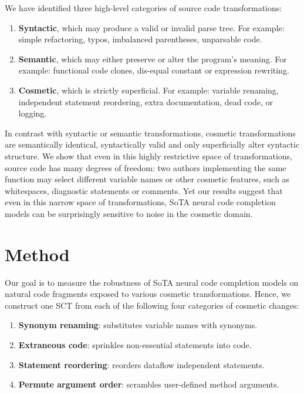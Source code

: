 \documentclass[usenames,dvipsnames]{article} %
\begin{document}
We have identified three high-level categories of source code transformations:

  \begin{enumerate}[itemsep=1ex]
    \item \textbf{Syntactic}, which may produce a valid or invalid parse tree. For example: simple refactoring, typos, imbalanced parentheses, unparsable code.
    \item \textbf{Semantic}, which may either preserve or alter the program's meaning. For example: functional code clones, dis-equal constant or expression rewriting.
    \item \textbf{Cosmetic}, which is strictly superficial. For example: variable renaming, independent statement reordering, extra documentation, dead code, or logging.
  \end{enumerate}

  In contrast with syntactic or semantic transformations, cosmetic transformations are semantically identical, syntactically valid and only superficially alter syntactic structure. We show that even in this highly restrictive space of transformations, source code has many degrees of freedom: two authors implementing the same function may select different variable names or other cosmetic features, such as whitespaces, diagnostic statements or comments.  Yet our results suggest that even in this narrow space of transformations, SoTA neural code completion models can be surprisingly sensitive to noise in the cosmetic domain.

  \section{Method}\label{sec:method}

  Our goal is to measure the robustness of SoTA neural code completion models on natural code fragments exposed to various cosmetic transformations. Hence, we construct one SCT from each of the following four categories of cosmetic changes:

  \begin{enumerate}[itemsep=1ex]
    \item \textbf{Synonym renaming}: substitutes variable names with synonyms.
    \item \textbf{Extraneous code}: sprinkles non-essential statements into code.
    \item \textbf{Statement reordering}: reorders dataflow independent statements.
    \item \textbf{Permute argument order}: scrambles user-defined method arguments.
  \end{enumerate}
\end{document}
